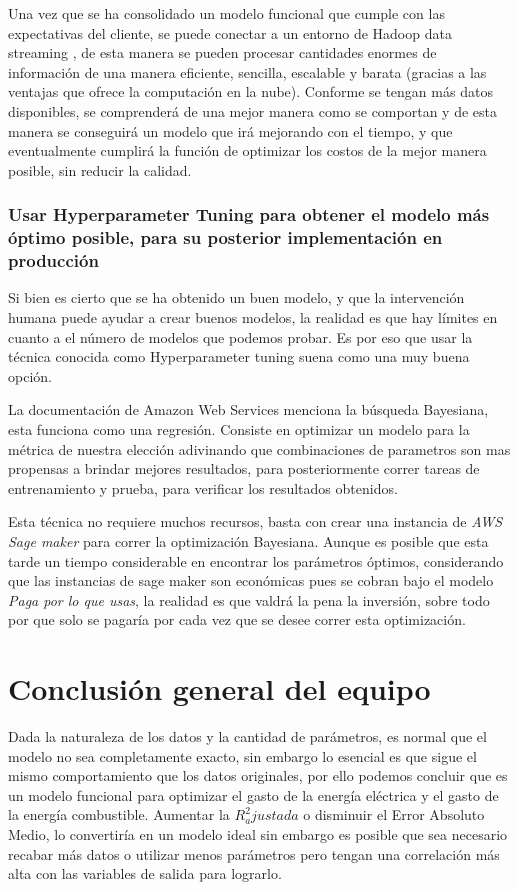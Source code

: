 \documentclass{article}
\begin{document}
Una vez que se ha consolidado un modelo funcional que cumple con las expectativas del cliente, se puede conectar a un entorno de Hadoop data streaming \cite{hadoop}, de esta manera se pueden procesar cantidades enormes de información de una manera eficiente, sencilla, escalable y barata (gracias a las ventajas que ofrece la computación en la nube). Conforme se tengan más datos disponibles, se comprenderá de una mejor manera como se comportan y de esta manera se conseguirá un modelo que irá mejorando con el tiempo, y que eventualmente cumplirá la función de optimizar los costos de la mejor manera posible, sin reducir la calidad. 

\subsubsection{Usar Hyperparameter Tuning para obtener el modelo más óptimo posible, para su posterior implementación en producción}

Si bien es cierto que se ha obtenido un buen modelo, y que la intervención humana puede ayudar a crear buenos modelos, la realidad es que hay límites en cuanto a el número de modelos que podemos probar. Es por eso que usar la técnica conocida como Hyperparameter tuning suena como una muy buena opción.

La documentación de Amazon Web Services menciona la búsqueda Bayesiana, esta funciona como una regresión. Consiste en optimizar un modelo para la métrica de nuestra elección adivinando que combinaciones de parametros son mas propensas a brindar mejores resultados, para posteriormente correr tareas de entrenamiento y prueba, para verificar los resultados obtenidos. \cite{hyperpar}

Esta técnica no requiere muchos recursos, basta con crear una instancia de \emph{AWS Sage maker} para correr la optimización Bayesiana. Aunque es posible que esta tarde un tiempo considerable en encontrar los parámetros óptimos, considerando que las instancias de sage maker son económicas pues se cobran bajo el modelo \emph{Paga por lo que usas}, la realidad es que valdrá la pena la inversión, sobre todo por que solo se pagaría por cada vez que se desee correr esta optimización. 

\section{Conclusión general del equipo}

Dada la naturaleza de los datos y la cantidad de parámetros, es normal que el modelo no sea completamente exacto, sin embargo lo esencial es que sigue el mismo comportamiento que los datos originales, por ello podemos concluir que es un modelo funcional para optimizar el gasto de la energía eléctrica y el gasto de la energía combustible. Aumentar la $R^2_ajustada$ o disminuir el Error Absoluto Medio,  lo convertiría en un modelo ideal sin embargo es posible que sea necesario recabar más datos o utilizar menos parámetros pero tengan una correlación más alta con las variables de salida para lograrlo.
\end{document}
